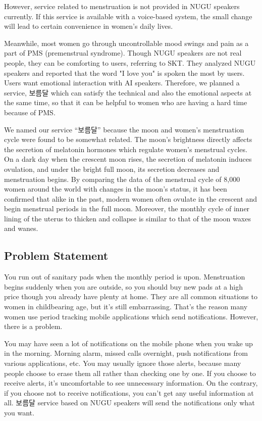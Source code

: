 \documentclass[conference]{IEEEtran}
\begin{document}
However, service related to menstruation is not provided in NUGU speakers currently. If this service is available with a voice-based system, the small change will lead to certain convenience in women's daily lives.

Meanwhile, most women go through uncontrollable mood swings and pain as a part of PMS (premenstrual syndrome). Though NUGU speakers are not real people, they can be comforting to users, referring to SKT. They analyzed NUGU speakers and reported that the word "I love you" is spoken the most by users. Users want emotional interaction with AI speakers. Therefore, we planned a service, 보름달 which can satisfy the technical and also the emotional aspects at the same time, so that it can be helpful to women who are having a hard time because of PMS. 

We named our service “보름달” because the moon and women's menstruation cycle were found to be somewhat related. The moon's brightness directly affects the secretion of melatonin hormones which regulate women's menstrual cycles. On a dark day when the crescent moon rises, the secretion of melatonin induces ovulation, and under the bright full moon, its secretion decreases and menstruation begins. By comparing the data of the menstrual cycle of 8,000 women around the world with changes in the moon's status, it has been confirmed that alike in the past, modern women often ovulate in the crescent and begin menstrual periods in the full moon\cite{b2}. Moreover, the monthly cycle of inner lining of the uterus to thicken and collapse is similar to that of the moon waxes and wanes.
\subsection{Problem Statement}
You run out of sanitary pads when the monthly period is upon. Menstruation begins suddenly when you are outside, so you should buy new pads at a high price though you already have plenty at home. They are all common situations to women in childbearing age, but it's still embarrassing. That’s the reason many women use period tracking mobile applications which send notifications. However, there is a problem. 

You may have seen a lot of notifications on the mobile phone when you wake up in the morning. Morning alarm, missed calls overnight, push notifications from various applications, etc. You may usually ignore those alerts, because many people choose to erase them all rather than checking one by one. If you choose to receive alerts, it's uncomfortable to see unnecessary information. On the contrary, if you choose not to receive notifications, you can't get any useful information at all. 보름달 service based on NUGU speakers will send the notifications only what you want.
\end{document}
